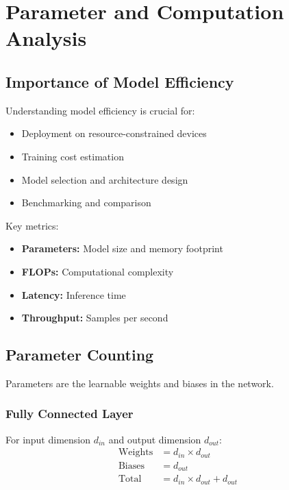 %

\clearpage
\cleardoublepage

\chapter{Parameter and Computation Analysis}

\section{Importance of Model Efficiency}

Understanding model efficiency is crucial for:
\begin{itemize}
    \item Deployment on resource-constrained devices
    \item Training cost estimation
    \item Model selection and architecture design
    \item Benchmarking and comparison
\end{itemize}

Key metrics:
\begin{itemize}
    \item \textbf{Parameters:} Model size and memory footprint
    \item \textbf{FLOPs:} Computational complexity
    \item \textbf{Latency:} Inference time
    \item \textbf{Throughput:} Samples per second
\end{itemize}

\section{Parameter Counting}

Parameters are the learnable weights and biases in the network.

\subsection{Fully Connected Layer}

For input dimension $d_{in}$ and output dimension $d_{out}$:
\begin{align}
\text{Weights} &= d_{in} \times d_{out} \\
\text{Biases} &= d_{out} \\
\text{Total} &= d_{in} \times d_{out} + d_{out}
\end{align}

